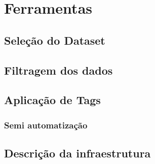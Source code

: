 \chapter[Ferramentas]{Ferramentas}

\section{Seleção do Dataset}


\section{Filtragem dos dados}

\section{Aplicação de Tags}

\subsection{Semi automatização}

\section{Descrição da infraestrutura}


